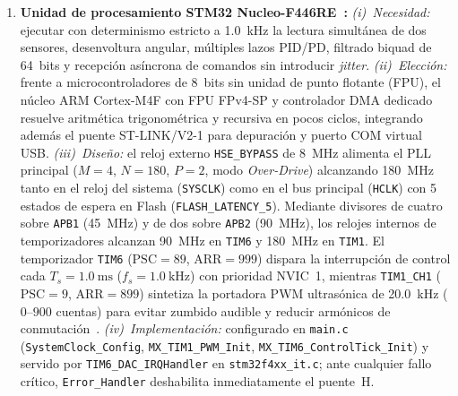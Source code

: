\begin{enumerate}
    \item \textbf{Unidad de procesamiento STM32 Nucleo-F446RE~\cite{STM32F446RE_Datasheet}:}
    \textit{(i)~Necesidad:} ejecutar con determinismo estricto a \qty{1.0}{\kilo\hertz} la lectura simultánea de dos sensores, desenvoltura angular, múltiples lazos PID/PD, filtrado biquad de 64~bits y recepción asíncrona de comandos sin introducir \textit{jitter}.
    \textit{(ii)~Elección:} frente a microcontroladores de 8~bits sin unidad de punto flotante (FPU), el núcleo ARM Cortex-M4F con FPU FPv4-SP y controlador DMA dedicado resuelve aritmética trigonométrica y recursiva en pocos ciclos, integrando además el puente ST-LINK/V2-1 para depuración y puerto COM virtual USB.
    \textit{(iii)~Diseño:} el reloj externo \texttt{HSE\_BYPASS} de \qty{8}{\mega\hertz} alimenta el PLL principal ($M=4$, $N=180$, $P=2$, modo \textit{Over-Drive}) alcanzando \qty{180}{\mega\hertz} tanto en el reloj del sistema (\texttt{SYSCLK}) como en el bus principal (\texttt{HCLK}) con 5 estados de espera en Flash (\texttt{FLASH\_LATENCY\_5}). Mediante divisores de cuatro sobre \texttt{APB1} (\qty{45}{\mega\hertz}) y de dos sobre \texttt{APB2} (\qty{90}{\mega\hertz}), los relojes internos de temporizadores alcanzan \qty{90}{\mega\hertz} en \texttt{TIM6} y \qty{180}{\mega\hertz} en \texttt{TIM1}. El temporizador \texttt{TIM6} ($\text{PSC}=89$, $\text{ARR}=999$) dispara la interrupción de control cada $T_s=\qty{1.0}{\milli\second}$ ($f_s=\qty{1.0}{\kilo\hertz}$) con prioridad NVIC~1, mientras \texttt{TIM1\_CH1} ($\text{PSC}=9$, $\text{ARR}=899$) sintetiza la portadora PWM ultrasónica de \qty{20.0}{\kilo\hertz} ($0\text{--}900$ cuentas) para evitar zumbido audible y reducir armónicos de conmutación~\cite{Petric2022}.
    \textit{(iv)~Implementación:} configurado en \texttt{main.c} (\texttt{SystemClock\_Config}, \texttt{MX\_TIM1\_PWM\_Init}, \texttt{MX\_TIM6\_ControlTick\_Init}) y servido por \texttt{TIM6\_DAC\_IRQHandler} en \texttt{stm32f4xx\_it.c}; ante cualquier fallo crítico, \texttt{Error\_Handler} deshabilita inmediatamente el puente~H.


\end{enumerate}
